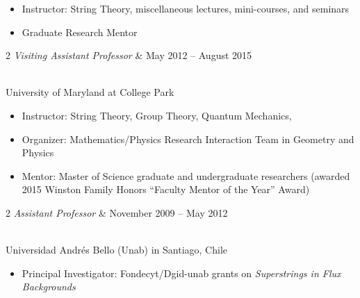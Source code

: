 \documentclass{res}
\begin{document}
{\begin{resume}
\begin{itemize}
\item Instructor: String Theory, miscellaneous lectures, mini-courses, and seminars
\item Graduate Research Mentor
\end{itemize}
\begin{ncolumn}{2}
{\it Visiting Assistant Professor}  &   May 2012 -- August 2015
\end{ncolumn}\\
University of Maryland at College Park
\begin{itemize} \itemsep1pt \parskip0pt 
\item Instructor: String Theory, Group Theory, Quantum Mechanics, 
\item Organizer: Mathematics/Physics Research Interaction Team in Geometry and Physics 
\item Mentor: Master of Science graduate and undergraduate researchers (awarded 2015 Winston Family Honors ``Faculty Mentor of the Year'' Award)
\end{itemize}
\begin{ncolumn}{2} 
{\it Assistant Professor} &  November 2009 -- May 2012
\end{ncolumn}\\
Universidad Andr\'es Bello (U{\sc nab}) in Santiago, Chile 
\begin{itemize} \itemsep1pt \parskip0pt 
\item Principal Investigator: F{\sc ondecyt}/D{\sc gid-unab} grants on {\it Superstrings in Flux Backgrounds} 

\end{itemize}
\end{resume}}
\end{document}
